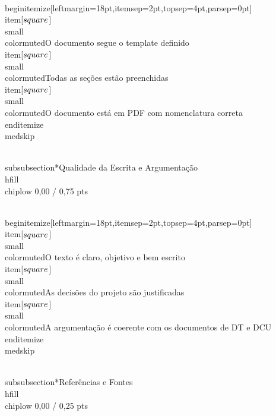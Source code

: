 \documentclass[11pt, a4paper]{article}
\newcommand{\chiplow}[1]{\colorbox{crimsondim}{\color{crimson}\semibold\small\strut\ #1\ }}
\begin{document}
\\begin{itemize}[leftmargin=18pt,itemsep=2pt,topsep=4pt,parsep=0pt]
  \\item[$\\square$] {\\small\\color{muted}O documento segue o template definido}
  \\item[$\\square$] {\\small\\color{muted}Todas as seções estão preenchidas}
  \\item[$\\square$] {\\small\\color{muted}O documento está em PDF com nomenclatura correta}
\\end{itemize}
\\medskip

\\subsubsection*{Qualidade da Escrita e Argumentação \\hfill {\\chiplow 0,00 / 0,75 pts}}

\\begin{itemize}[leftmargin=18pt,itemsep=2pt,topsep=4pt,parsep=0pt]
  \\item[$\\square$] {\\small\\color{muted}O texto é claro, objetivo e bem escrito}
  \\item[$\\square$] {\\small\\color{muted}As decisões do projeto são justificadas}
  \\item[$\\square$] {\\small\\color{muted}A argumentação é coerente com os documentos de DT e DCU}
\\end{itemize}
\\medskip

\\subsubsection*{Referências e Fontes \\hfill {\\chiplow 0,00 / 0,25 pts}}
\end{document}
